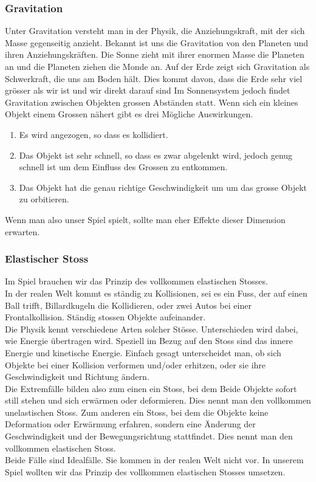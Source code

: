 \documentclass[12pt,a4paper]{scrartcl}
\begin{document}
\subsubsection{Gravitation}
Unter Gravitation versteht man in der Physik, die Anziehungskraft, mit der sich Masse gegenseitig anzieht.
Bekannt ist uns die Gravitation von den Planeten und ihren Anziehungskräften.
Die Sonne zieht mit ihrer enormen Masse die Planeten an und die Planeten ziehen die Monde an.
Auf der Erde zeigt sich Gravitation als Schwerkraft, die uns am Boden hält.
Dies kommt davon, dass die Erde sehr viel grösser als wir ist und wir direkt darauf sind
Im Sonnensystem jedoch findet Gravitation zwischen Objekten grossen Abständen statt.
Wenn sich ein kleines Objekt einem Grossen nähert gibt es drei Mögliche Auswirkungen.
\begin{enumerate}
\item Es wird angezogen, so dass es kollidiert.
\item Das Objekt ist sehr schnell, so dass es zwar abgelenkt wird, jedoch genug schnell ist um dem Einfluss des Grossen zu entkommen.
\item Das Objekt hat die genau richtige Geschwindigkeit um um das grosse Objekt zu orbitieren.
\end{enumerate}
Wenn man also unser Spiel spielt, sollte man eher Effekte dieser Dimension erwarten.

\subsubsection{Elastischer Stoss}
Im Spiel brauchen wir das Prinzip des vollkommen elastischen Stosses. \\
In der realen Welt kommt es ständig zu Kollisionen, sei es ein Fuss, der auf einen Ball trifft, Billardkugeln die Kollidieren, oder zwei Autos bei einer Frontalkollision. 
Ständig stossen Objekte aufeinander. \\
Die Physik kennt verschiedene Arten solcher Stösse.
Unterschieden wird dabei, wie Energie übertragen wird.
Speziell im Bezug auf den Stoss sind das innere Energie und kinetische Energie.
Einfach gesagt unterscheidet man, ob sich Objekte bei einer Kollision verformen und/oder erhitzen, oder sie ihre Geschwindigkeit und Richtung ändern.\\
Die Extremfälle bilden also zum einen ein Stoss, bei dem Beide Objekte sofort still stehen und sich erwärmen oder deformieren.
Dies nennt man den vollkommen unelastischen Stoss.
Zum anderen ein Stoss, bei dem die Objekte keine Deformation oder Erwärmung erfahren, sondern eine Änderung der Geschwindigkeit und der Bewegungsrichtung stattfindet.
Dies nennt man den vollkommen elastischen Stoss.\\
Beide Fälle sind Idealfälle.
Sie kommen in der realen Welt nicht vor.
In unserem Spiel wollten wir das Prinzip des vollkommen elastischen Stosses umsetzen.\\
\end{document}
